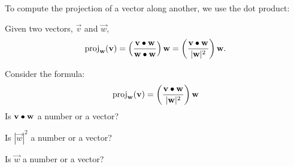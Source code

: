 \documentclass{ximera}
\begin{document}
To compute the projection of a vector along another, we use the dot
product:

\begin{theorem}
  Given two vectors, $\vec{v}$ and $\vec{w}$,
  \[
  \operatorname{proj}_\mathbf{w}(\mathbf{v}) =\left(\frac{\mathbf{v} \bullet \mathbf{w}}{\mathbf{w}\bullet \mathbf{w}}\right) \mathbf{w}=\left(\frac{\mathbf{v} \bullet \mathbf{w}}{|\mathbf{w}|^2}\right) \mathbf{w}.
  \]
\end{theorem}

\begin{question}
  Consider the formula:
  \[
  \operatorname{proj}_\mathbf{w}(\mathbf{v}) =\left(\frac{\mathbf{v} \bullet \mathbf{w}}{|\mathbf{w}|^2}\right) \mathbf{w}
  \]
  Is $\mathbf{v}\bullet \mathbf{w}$ a number or a vector?
  \begin{prompt}
  \begin{multipleChoice}
  \end{multipleChoice}
  \end{prompt}
  \begin{question}
    Is $|\vec{w}|^2$ a number or a vector?
     \begin{prompt}
    \begin{multipleChoice}  
      \end{multipleChoice}
     \end{prompt}
    \begin{question}
      Is $\vec{w}$ a number or a vector?
      \begin{prompt}
        \begin{multipleChoice}
        \end{multipleChoice}
      \end{prompt}
    \end{question}
  \end{question}
\end{question}
\end{document}
